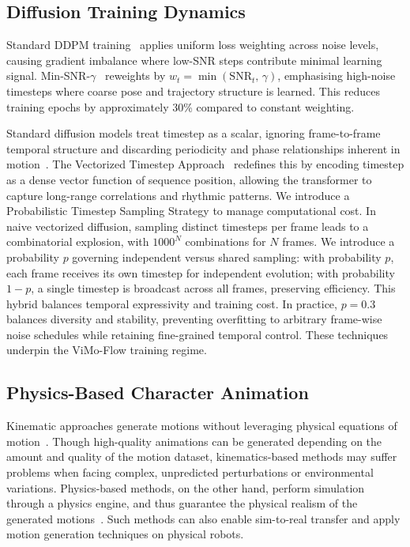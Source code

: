 \subsection{Diffusion Training Dynamics}

Standard DDPM training~\cite{ddpm2020} applies uniform loss weighting across noise levels, causing gradient imbalance where low-SNR steps contribute minimal learning signal. Min-SNR-$\gamma$~\cite{minsnr2024} reweights by $w_t = \min(\mathrm{SNR}_t,\, \gamma)$, emphasising high-noise timesteps where coarse pose and trajectory structure is learned. This reduces training epochs by approximately 30\% compared to constant weighting.

Standard diffusion models treat timestep as a scalar, ignoring frame-to-frame temporal structure and discarding periodicity and phase relationships inherent in motion~\cite{ddpm2020}. The Vectorized Timestep Approach~\cite{ptss2024} redefines this by encoding timestep as a dense vector function of sequence position, allowing the transformer to capture long-range correlations and rhythmic patterns. We introduce a Probabilistic Timestep Sampling Strategy to manage computational cost. In naive vectorized diffusion, sampling distinct timesteps per frame leads to a combinatorial explosion, with $1000^N$ combinations for $N$ frames. We introduce a probability $p$ governing independent versus shared sampling: with probability $p$, each frame receives its own timestep for independent evolution; with probability $1-p$, a single timestep is broadcast across all frames, preserving efficiency. This hybrid balances temporal expressivity and training cost. In practice, $p=0.3$ balances diversity and stability, preventing overfitting to arbitrary frame-wise noise schedules while retaining fine-grained temporal control. These techniques underpin the ViMo-Flow training regime.

\subsection{Physics-Based Character Animation}

Kinematic approaches generate motions without leveraging physical equations of motion~\cite{phasefunc2017, lmm2020}. Though high-quality animations can be generated depending on the amount and quality of the motion dataset, kinematics-based methods may suffer problems when facing complex, unpredicted perturbations or environmental variations. Physics-based methods, on the other hand, perform simulation through a physics engine, and thus guarantee the physical realism of the generated motions~\cite{mujoco2012}. Such methods can also enable sim-to-real transfer and apply motion generation techniques on physical robots.

